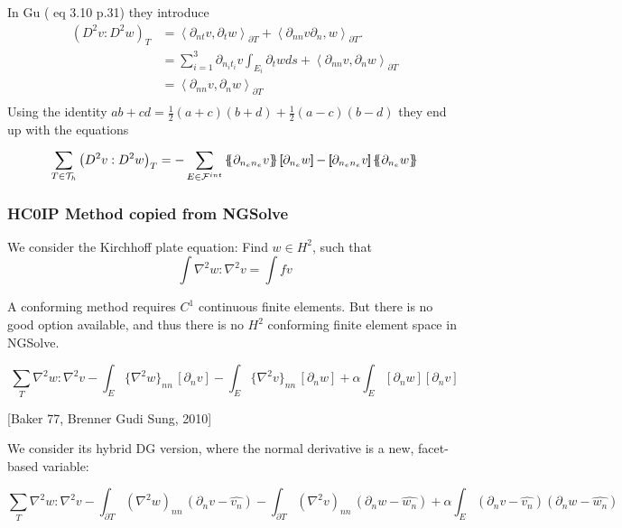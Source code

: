 \begin{enumerate}[label=(\alph*)]
In Gu \cite{gu2012c0} ( eq 3.10 p.31) they introduce \[
            \begin{split}
    \left( D^2v: D^2w \right)_{T } & = \left<\partial _{nt} v , \partial _{t} w  \right>_{\partial T} + \left< \partial
    _{nn} v
    \partial _{n}, w \right>_{\partial T}. \\
    &= \sum_{i=1}^{3} \partial _{n_{i} t_{i}} v \int_{E_{i}}^{} \partial _{t} w ds +\left< \partial
    _{nn} v,
    \partial _{n} w \right>_{\partial T}     \\
    &=\left< \partial
    _{nn} v,
    \partial _{n} w \right>_{\partial T}  \\
            \end{split}
    \]
    Using the identity $ab +cd = \frac{1}{2} (a+c)(b+d) + \frac{1}{2}(a-c)(b-d) $  they end up with the equations  \[
    \sum_{T \in \mathcal{T}_{h}  }^{} \left( D^2v: D^2w \right)_{T }  =
    - \sum_{E \in \mathcal{F} ^{int}}^{}  \mean{ \partial _{n_e n_{e}} v  } \jump{ \partial _{n_{e}} w } - \jump{
    \partial _{n_e n_{e}} v}  \mean{ \partial _{n_{e}} w }
    \]
\end{enumerate}


\subsubsection{HC0IP Method copied from NGSolve}%
\label{ssub:hc0ip_method_from_ngsolve}


We consider the Kirchhoff plate equation: Find $w \in H^2$, such that
$$
\int \nabla^2 w : \nabla^2 v = \int f v
$$

A conforming method requires $C^1$ continuous finite elements. But there is no good option available, and thus there is no $H^2$ conforming finite element space in NGSolve.

$$
\sum_T \nabla^2 w : \nabla^2 v
- \int_{E} \{\nabla^2 w\}_{nn} \, [\partial_n v]
- \int_{E} \{\nabla^2 v\}_{nn} \, [\partial_n w] + \alpha \int_E  [\partial_n w]  [\partial_n v]
$$

[Baker 77, Brenner Gudi Sung, 2010]

We consider its hybrid DG version, where the normal derivative is a new, facet-based variable:

$$
\sum_T \nabla^2 w : \nabla^2 v
- \int_{\partial T} (\nabla^2 w)_{nn} \, (\partial_n v - \widehat{v_n})
- \int_{\partial T} (\nabla^2 v)_{nn} \, (\partial_n w - \widehat{w_n}) + \alpha \int_E (\partial_n v - \widehat{v_n}) (\partial_n w - \widehat{w_n})
$$









